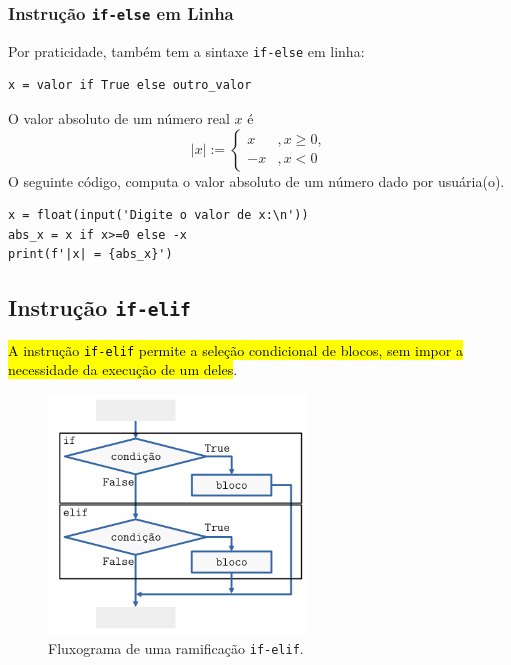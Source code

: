 \subsubsection{Instrução \lstinline+if-else+ em Linha}

Por praticidade, {\python} também tem a sintaxe \lstinline+if-else+ em linha:

\begin{lstlisting}
x = valor if True else outro_valor
\end{lstlisting}

\begin{ex}
  O valor absoluto de um número real $x$ é
  \begin{equation}
    |x| := \left\{
      \begin{array}{ll}
        x &, x\geq 0,\\
        -x &, x<0
      \end{array}
    \right.
  \end{equation}
  O seguinte código, computa o valor absoluto de um número dado por usuária(o).
  
\begin{lstlisting}
x = float(input('Digite o valor de x:\n'))
abs_x = x if x>=0 else -x
print(f'|x| = {abs_x}')
\end{lstlisting}

\end{ex}

\subsection{Instrução \texttt{if-elif}}

\hl{A instrução \texttt{if-elif} permite a seleção condicional de blocos, sem impor a necessidade da execução de um deles}.

\begin{figure}[H]
  \centering
  \includegraphics[width=2.7in]{./cap_progest/dados/fig_fg_elif/fig.png}
  \caption{Fluxograma de uma ramificação \lstinline+if-elif+.}
  \label{cap_progest_sec_ramifica:fig:fg_elif}
\end{figure}

